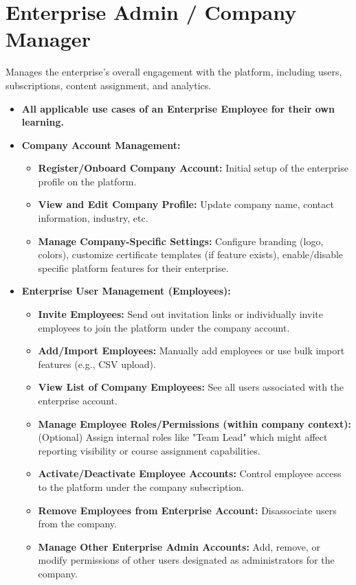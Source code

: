 \documentclass[12pt, a4paper]{report} %
\begin{document}
\section{Enterprise Admin / Company Manager}
Manages the enterprise's overall engagement with the platform, including users, subscriptions, content assignment, and analytics.
  \begin{itemize}
    \item \textbf{All applicable use cases of an Enterprise Employee for their own learning.}
    \item \textbf{Company Account Management:}
        \begin{itemize}
            \item \textbf{Register/Onboard Company Account:} Initial setup of the enterprise profile on the platform.
            \item \textbf{View and Edit Company Profile:} Update company name, contact information, industry, etc.
            \item \textbf{Manage Company-Specific Settings:} Configure branding (logo, colors), customize certificate templates (if feature exists), enable/disable specific platform features for their enterprise.
        \end{itemize}
    \item \textbf{Enterprise User Management (Employees):}
        \begin{itemize}
            \item \textbf{Invite Employees:} Send out invitation links or individually invite employees to join the platform under the company account.
            \item \textbf{Add/Import Employees:} Manually add employees or use bulk import features (e.g., CSV upload).
            \item \textbf{View List of Company Employees:} See all users associated with the enterprise account.
            \item \textbf{Manage Employee Roles/Permissions (within company context):} (Optional) Assign internal roles like "Team Lead" which might affect reporting visibility or course assignment capabilities.
            \item \textbf{Activate/Deactivate Employee Accounts:} Control employee access to the platform under the company subscription.
            \item \textbf{Remove Employees from Enterprise Account:} Disassociate users from the company.
            \item \textbf{Manage Other Enterprise Admin Accounts:} Add, remove, or modify permissions of other users designated as administrators for the company.

\end{itemize}
\end{itemize}
\end{document}
